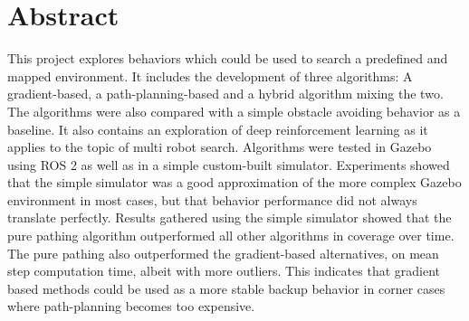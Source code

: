 \section*{Abstract}
\label{sec:Abstract}
This project explores behaviors which could be used to search a predefined and mapped environment. It includes the development of three algorithms: A gradient-based, a path-planning-based and a hybrid algorithm mixing the two. The algorithms were also compared with a simple obstacle avoiding behavior as a baseline. It also contains an exploration of deep reinforcement learning as it applies to the topic of multi robot search. Algorithms were tested in Gazebo using ROS 2 as well as in a simple custom-built simulator. Experiments showed that the simple simulator was a good approximation of the more complex Gazebo environment in most cases, but that behavior performance did not always translate perfectly. Results gathered using the simple simulator showed that the pure pathing algorithm outperformed all other algorithms in coverage over time. The pure pathing also outperformed the gradient-based alternatives, on mean step computation time, albeit with more outliers. This indicates that gradient based methods could be used as a more stable backup behavior in corner cases where path-planning becomes too expensive.
